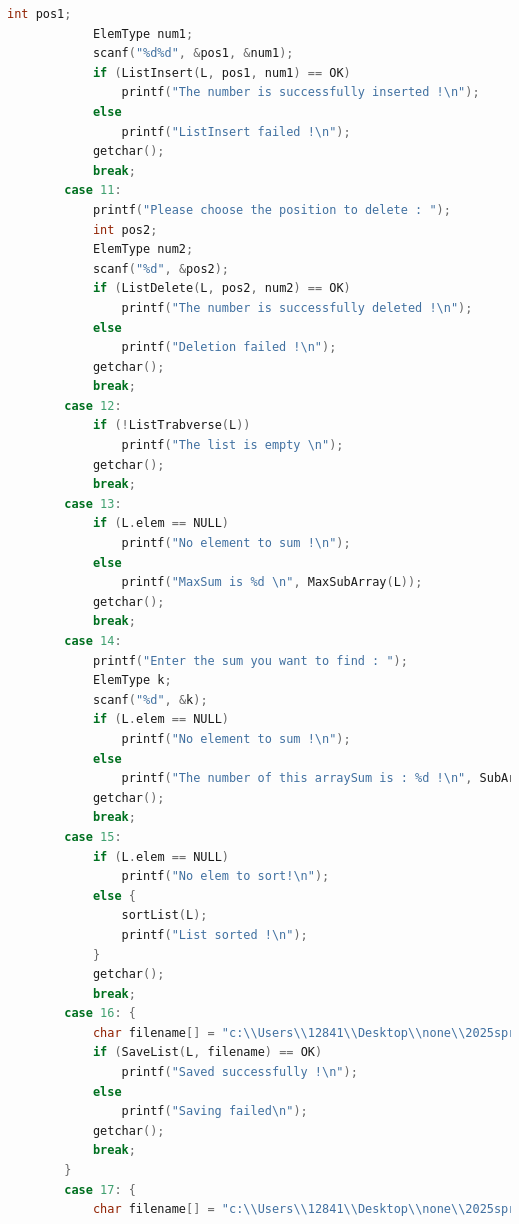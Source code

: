 \documentclass[supercite]{Experimental_Report}
\theoremstyle{definition}
\begin{document}
\begin{lstlisting}[language=c]
            int pos1;
            ElemType num1;
            scanf("%d%d", &pos1, &num1);
            if (ListInsert(L, pos1, num1) == OK)
                printf("The number is successfully inserted !\n");
            else
                printf("ListInsert failed !\n");
            getchar();
            break;
        case 11:
            printf("Please choose the position to delete : ");
            int pos2;
            ElemType num2;
            scanf("%d", &pos2);
            if (ListDelete(L, pos2, num2) == OK)
                printf("The number is successfully deleted !\n");
            else
                printf("Deletion failed !\n");
            getchar();
            break;
        case 12:
            if (!ListTrabverse(L))
                printf("The list is empty \n");
            getchar();
            break;
        case 13:
            if (L.elem == NULL)
                printf("No element to sum !\n");
            else
                printf("MaxSum is %d \n", MaxSubArray(L));
            getchar();
            break;
        case 14:
            printf("Enter the sum you want to find : ");
            ElemType k;
            scanf("%d", &k);
            if (L.elem == NULL)
                printf("No element to sum !\n");
            else
                printf("The number of this arraySum is : %d !\n", SubArrayNum(L, k));
            getchar();
            break;
        case 15:
            if (L.elem == NULL)
                printf("No elem to sort!\n");
            else {
                sortList(L);
                printf("List sorted !\n");
            }
            getchar();
            break;
        case 16: {
            char filename[] = "c:\\Users\\12841\\Desktop\\none\\2025springDS\\experiments\\ex1\\list1.txt";
            if (SaveList(L, filename) == OK)
                printf("Saved successfully !\n");
            else
                printf("Saving failed\n");
            getchar();
            break;
        }
        case 17: {
            char filename[] = "c:\\Users\\12841\\Desktop\\none\\2025springDS\\experiments\\ex1\\list1.txt";

\end{lstlisting}
\end{document}
